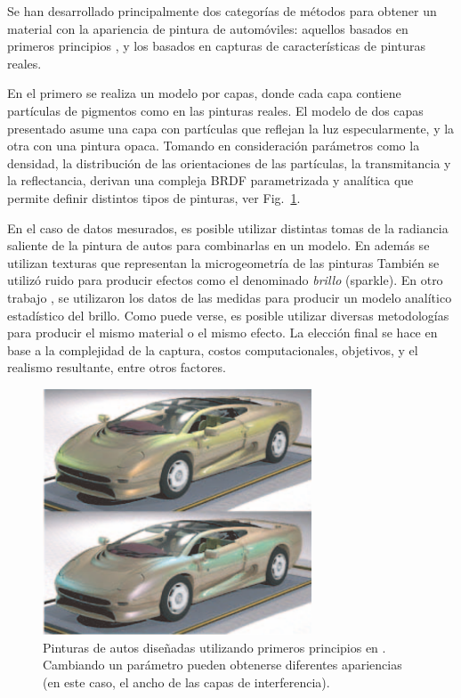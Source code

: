 Se han desarrollado principalmente dos categorías de métodos para obtener un material con la apariencia de pintura de automóviles: aquellos basados en primeros principios \cite{Ershov2001}, y los basados en capturas de características de pinturas reales.

En el primero se realiza un modelo por capas, donde cada capa contiene partículas de pigmentos como en las pinturas reales.
El modelo de dos capas presentado asume una capa con partículas que reflejan la luz especularmente, y la otra con una pintura opaca.
Tomando en consideración parámetros como la densidad, la distribución de las orientaciones de las partículas, la transmitancia y la reflectancia, derivan una compleja BRDF parametrizada y analítica que permite definir distintos tipos de pinturas, ver Fig.~\ref{fg:pinturaauto}.

En el caso de datos mesurados, es posible utilizar distintas tomas de la radiancia saliente de la pintura de autos para combinarlas en un modelo.
En \cite{Dumont2001} además se utilizan texturas que representan la microgeometría de las pinturas También se utilizó ruido para producir efectos como el denominado {\em brillo} (sparkle).
En otro trabajo \cite{Gunther2005}, se utilizaron los datos de las medidas para producir un modelo analítico estadístico del brillo.
Como puede verse, es posible utilizar diversas metodologías para producir el mismo material o el mismo efecto.
La elección final se hace en base a la complejidad de la captura, costos computacionales, objetivos, y el realismo resultante, entre otros factores.

\begin{figure}
\center
\includegraphics[width=8cm]{figures/pinturaauto}
\caption[Pinturas de autos diseñadas utilizando primeros principios]{Pinturas de autos diseñadas utilizando primeros principios en \cite{Ershov2001}. Cambiando un parámetro pueden obtenerse diferentes apariencias (en este caso, el ancho de las capas de interferencia).}
\label{fg:pinturaauto}
\end{figure}


